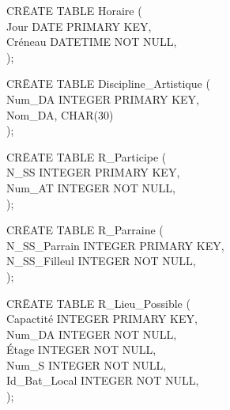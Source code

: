\documentclass[a4paper,10.5pt]{report}
\begin{document}
		\begin{tabbing}
			CR\=EATE TABLE Horaire (\\
			\> Jour DATE PRIMARY KEY,\\
			\> Créneau DATETIME NOT NULL,\\);
		\end{tabbing}
		\begin{tabbing}
			CR\=EATE TABLE Discipline\_Artistique (\\
			\> Num\_DA INTEGER PRIMARY KEY,\\
			\> Nom\_DA, CHAR(30)\\);
		\end{tabbing}
		\begin{tabbing}
			CR\=EATE TABLE R\_Participe (\\
			\> N\_SS INTEGER PRIMARY KEY,\\
			\> Num\_AT INTEGER NOT NULL,\\);
		\end{tabbing}
		\begin{tabbing}
			CR\=EATE TABLE R\_Parraine (\\
			\> N\_SS\_Parrain INTEGER PRIMARY KEY,\\
			\> N\_SS\_Filleul INTEGER NOT NULL,\\);
		\end{tabbing}
		\begin{tabbing}
			CR\=EATE TABLE R\_Lieu\_Possible (\\
			\> Capactité INTEGER PRIMARY KEY,\\
			\> Num\_DA INTEGER NOT NULL,\\
			\> Étage INTEGER NOT NULL,\\
			\> Num\_S INTEGER NOT NULL,\\
			\> Id\_Bat\_Local INTEGER NOT NULL,\\);
		\end{tabbing}
\end{document}
